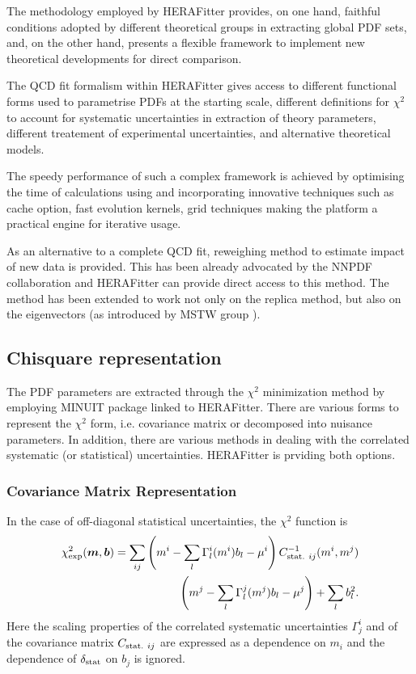 
The methodology employed by HERAFitter provides,  
 on one hand, faithful conditions adopted by different theoretical 
groups in extracting global PDF sets, and, on the other hand,  presents
a flexible framework to implement new theoretical developments for 
direct comparison.

The QCD fit formalism within HERAFitter gives access to different functional 
forms used to parametrise PDFs at the starting scale, different definitions for $\chi^2$ to account for systematic uncertainties in extraction of theory parameters, different treatement of experimental uncertainties, and alternative theoretical models. 

The speedy performance of such a complex framework is achieved by optimising the time of calculations using and incorporating innovative techniques such as cache option, fast evolution kernels, grid techniques making the platform a practical engine for iterative usage.

As an alternative to a complete QCD fit, reweighing method to estimate impact of new data is provided. 
This has been already advocated by the NNPDF collaboration \cite{Ball:2011gg,Ball:2010gb} and HERAFitter can provide 
direct access to this method. The method has been extended to work not only on the replica method, 
but also on the eigenvectors (as introduced by MSTW group \cite{Watt:2012tq}).





\subsection{Chisquare representation}

The PDF parameters are extracted through the $\chi^2$ minimization method by 
employing MINUIT package linked to HERAFitter. There are various forms to represent the $\chi^2$ form, i.e. covariance matrix or decomposed into nuisance parameters. In addition, there are various methods in dealing with the correlated systematic (or statistical) uncertainties.
HERAFitter is prviding both options.

\subsubsection{Covariance Matrix Representation}

In the case of off-diagonal statistical uncertainties, the $\chi^2$ function
is
\begin{align} 
 \label{eq:chi2gen}
    \chi^2_{\rm exp} (\boldsymbol{m},\boldsymbol{b}) = \sum_{ij} 
         \left ( m^i - \sum_l \Gamma^i_l(m^i)b_l - \mu^i \right) C^{-1}_{{\rm stat.}~ij}(m^i,m^j) \nonumber \\
     \left(  m^j - \sum_l \Gamma^j_l(m^j)b_l - \mu^j \right) +  \sum_l b^2_l.
\end{align}
Here the scaling properties of the correlated systematic uncertainties 
$\Gamma^i_j$ and
of the covariance matrix $C_{{\rm stat.}~ij}$ are expressed as a dependence
on $m_i$ and the dependence of $\delta_{\rm stat}$ on $b_j$ is ignored.

